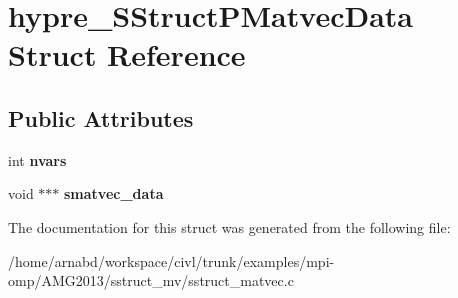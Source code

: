 \hypertarget{structhypre__SStructPMatvecData}{}\section{hypre\+\_\+\+S\+Struct\+P\+Matvec\+Data Struct Reference}
\label{structhypre__SStructPMatvecData}
\subsection*{Public Attributes}
\begin{DoxyCompactItemize}
\item 
\hypertarget{structhypre__SStructPMatvecData_a2aff3acd5542fb7add896da65fed0a8e}{}int {\bfseries nvars}\label{structhypre__SStructPMatvecData_a2aff3acd5542fb7add896da65fed0a8e}

\item 
\hypertarget{structhypre__SStructPMatvecData_aa4cc26c40e9665fb0bcf51e3c8aff9c9}{}void $\ast$$\ast$$\ast$ {\bfseries smatvec\+\_\+data}\label{structhypre__SStructPMatvecData_aa4cc26c40e9665fb0bcf51e3c8aff9c9}

\end{DoxyCompactItemize}


The documentation for this struct was generated from the following file\+:\begin{DoxyCompactItemize}
\item 
/home/arnabd/workspace/civl/trunk/examples/mpi-\/omp/\+A\+M\+G2013/sstruct\+\_\+mv/sstruct\+\_\+matvec.\+c\end{DoxyCompactItemize}
